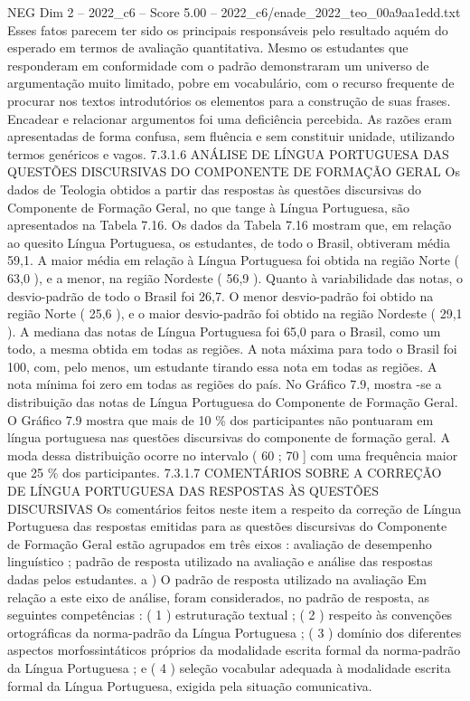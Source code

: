 \begin{textsample}{NEG Dim 2 – 2022\_c6 – Score 5.00 – 2022\_c6/enade\_2022\_teo\_00a9aa1edd.txt}
Esses fatos parecem ter sido os principais responsáveis pelo resultado aquém do esperado em termos de avaliação quantitativa.
Mesmo os estudantes que responderam em conformidade com o padrão demonstraram um universo de argumentação muito limitado, pobre em vocabulário, com o recurso frequente de procurar nos textos introdutórios os elementos para a construção de suas frases.
Encadear e relacionar argumentos foi uma deficiência percebida.
As razões eram apresentadas de forma confusa, sem fluência e sem constituir unidade, utilizando termos genéricos e vagos. 7.3.1.6 ANÁLISE DE LÍNGUA PORTUGUESA DAS QUESTÕES DISCURSIVAS DO COMPONENTE DE FORMAÇÃO GERAL Os dados de Teologia obtidos a partir das respostas às questões discursivas do Componente de Formação Geral, no que tange à Língua Portuguesa, são apresentados na Tabela 7.16.
Os dados da Tabela 7.16 mostram que, em relação ao quesito Língua Portuguesa, os estudantes, de todo o Brasil, obtiveram média 59,1.
A maior média em relação à Língua Portuguesa foi obtida na região Norte ( 63,0 ), e a menor, na região Nordeste ( 56,9 ).
Quanto à variabilidade das notas, o desvio-padrão de todo o Brasil foi 26,7.
O menor desvio-padrão foi obtido na região Norte ( 25,6 ), e o maior desvio-padrão foi obtido na região Nordeste ( 29,1 ).
A mediana das notas de Língua Portuguesa foi 65,0 para o Brasil, como um todo, a mesma obtida em todas as regiões.
A nota máxima para todo o Brasil foi 100, com, pelo menos, um estudante tirando essa nota em todas as regiões.
A nota mínima foi zero em todas as regiões do país.
No Gráfico 7.9, mostra -se a distribuição das notas de Língua Portuguesa do Componente de Formação Geral.
O Gráfico 7.9 mostra que mais de 10 \% dos participantes não pontuaram em língua portuguesa nas questões discursivas do componente de formação geral.
A moda dessa distribuição ocorre no intervalo ( 60 ; 70 ] com uma frequência maior que 25 \% dos participantes. 7.3.1.7 COMENTÁRIOS SOBRE A CORREÇÃO DE LÍNGUA PORTUGUESA DAS RESPOSTAS ÀS QUESTÕES DISCURSIVAS Os comentários feitos neste item a respeito da correção de Língua Portuguesa das respostas emitidas para as questões discursivas do Componente de Formação Geral estão agrupados em três eixos : avaliação de desempenho linguístico ; padrão de resposta utilizado na avaliação e análise das respostas dadas pelos estudantes. a ) O padrão de resposta utilizado na avaliação Em relação a este eixo de análise, foram considerados, no padrão de resposta, as seguintes competências : ( 1 ) estruturação textual ; ( 2 ) respeito às convenções ortográficas da norma-padrão da Língua Portuguesa ; ( 3 ) domínio dos diferentes aspectos morfossintáticos próprios da modalidade escrita formal da norma-padrão da Língua Portuguesa ; e ( 4 ) seleção vocabular adequada à modalidade escrita formal da Língua Portuguesa, exigida pela situação comunicativa.

\end{textsample}
